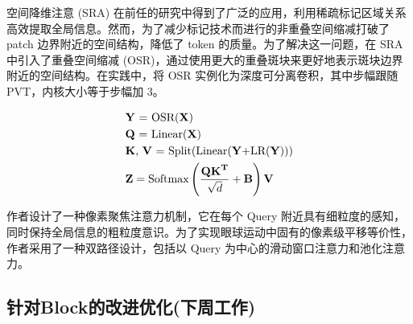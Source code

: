 \documentclass[a4paper]{ctexart}
\begin{document}
		空间降维注意 (SRA) 在前任的研究中得到了广泛的应用，利用稀疏标记区域关系高效提取全局信息。然而，为了减少标记技术而进行的非重叠空间缩减打破了 patch 边界附近的空间结构，降低了 token 的质量。为了解决这一问题，在 SRA 中引入了重叠空间缩减 (OSR)，通过使用更大的重叠斑块来更好地表示斑块边界附近的空间结构。在实践中，将 OSR 实例化为深度可分离卷积，其中步幅跟随 PVT，内核大小等于步幅加 3。
		
		\begin{equation}
			\begin{aligned}
				& \text{\textbf{Y} = OSR(\textbf{X})} \\
				& \text{\textbf{Q} = Linear(\textbf{X})} \\
				& \text{\textbf{K}, \textbf{V} = Split(Linear(\textbf{Y}+LR(\textbf{Y})))} \\
				& \textbf{Z} = \text{Softmax} \left(\frac{\textbf{QK}^{\textbf{T}}}{\sqrt{d}}+ \textbf{B}\right) \textbf{V}
			\end{aligned}
		\end{equation}
		
		作者设计了一种像素聚焦注意力机制，它在每个 Query 附近具有细粒度的感知，同时保持全局信息的粗粒度意识。为了实现眼球运动中固有的像素级平移等价性，作者采用了一种双路径设计，包括以 Query 为中心的滑动窗口注意力和池化注意力。
		
		\subsection*{针对Block的改进优化(下周工作)}
		
\end{document}
